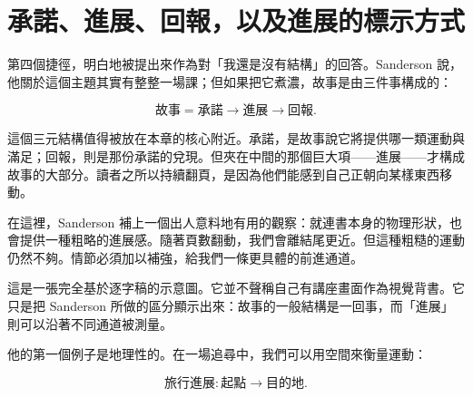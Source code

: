 \section{承諾、進展、回報，以及進展的標示方式}

第四個捷徑，明白地被提出來作為對「我還是沒有結構」的回答。Sanderson 說，他關於這個主題其實有整整一場課；但如果把它煮濃，故事是由三件事構成的：

\begin{equation}
\text{故事} = \text{承諾} \to \text{進展} \to \text{回報}.
\end{equation}

這個三元結構值得被放在本章的核心附近。承諾，是故事說它將提供哪一類運動與滿足；回報，則是那份承諾的兌現。但夾在中間的那個巨大項——進展——才構成故事的大部分。讀者之所以持續翻頁，是因為他們能感到自己正朝向某樣東西移動。

在這裡，Sanderson 補上一個出人意料地有用的觀察：就連書本身的物理形狀，也會提供一種粗略的進展感。隨著頁數翻動，我們會離結尾更近。但這種粗糙的運動仍然不夠。情節必須加以補強，給我們一條更具體的前進通道。

\begin{figure}
\centering
{}
\end{figure}

這是一張完全基於逐字稿的示意圖。它並不聲稱自己有講座畫面作為視覺背書。它只是把 Sanderson 所做的區分顯示出來：故事的一般結構是一回事，而「進展」則可以沿著不同通道被測量。

他的第一個例子是地理性的。在一場追尋中，我們可以用空間來衡量運動：

\begin{equation}
\text{旅行進展} : \text{起點} \to \text{目的地}.
\end{equation}

